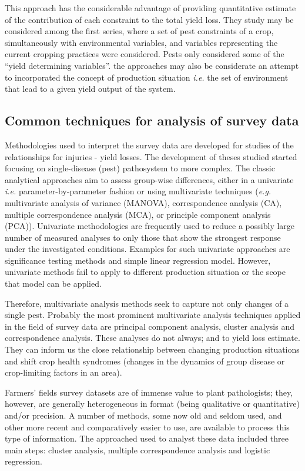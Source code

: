 This approach has the considerable advantage of providing quantitative estimate of the contribution of each constraint to the total yield loss. They study may be considered among the first series, where a set of pest constraints of a crop, simultaneously with environmental variables, and variables representing the current cropping practices were considered. Pests only considered some of the ``yield determining variables''. the approaches may also be considerate an attempt to incorporated the concept of production situation \textit{i.e.} the set of environment that lead to a given yield output of the system. 


\subsection*{Common techniques for analysis of survey data}

Methodologies used to interpret the survey data are developed for studies of the relationships for injuries - yield losses. The development of theses studied started focusing on single-disease (pest) pathosystem to more complex. The classic analytical approaches aim to assess group-wise differences, either in a univariate \textit{i.e.} parameter-by-parameter fashion or using multivariate techniques (\textit{e.g.} multivariate analysis of variance (MANOVA), correspondence analysis (CA), multiple correspondence analysis (MCA), or principle component analysis (PCA)). Univariate methodologies are frequently used to reduce a possibly large number of measured analyses to only those that show the strongest response under the investigated conditions. Examples for such univariate approaches are significance testing methods and simple linear regression model. However, univariate methods fail to apply to different production situation or the scope that model can be applied.


Therefore, multivariate analysis methods seek to capture not only changes of a single pest. Probably the most prominent multivariate analysis techniques applied in the field of survey data are principal component analysis, cluster analysis and correspondence analysis. These analyses do not always; and to yield loss estimate. They can inform us the close relationship between changing production situations and shift crop health syndromes (changes in the dynamics of group disease or crop-limiting factors in an area). 

Farmers' fields survey datasets are of immense value to plant pathologists; they, however, are generally heterogeneous in format (being qualitative or quantitative) and/or precision. A number of methods, some now old and seldom used, and other more recent and comparatively easier to use, are available to process this type of information. The approached used to analyst these data included three main steps: cluster analysis, multiple correspondence analysis and logistic regression.


